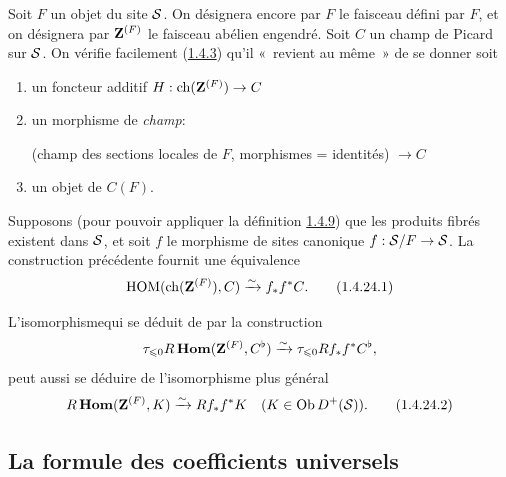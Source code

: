 \documentclass[10pt]{../fichiers-configuration-latex/smfart}
\begin{document}
\subsubsection{}
Soit $F$ un objet du site ${\mathcal S}$. On désignera encore par $F$
le faisceau défini par $F$, et on désignera par $\mathbf{Z}^{(F)}$ le
faisceau abélien engendré. Soit $C$ un champ de Picard sur
${\mathcal S}$. On vérifie facilement (\cf \hyperref[XVIII.lem1.4.3]{1.4.3}) qu'il « revient au même »  de se donner soit
\begin{enumerate}
\renewcommand{\theenumi}{\alph{enumi}}
\renewcommand{\labelenumi}{\theenumi)}
\item un foncteur additif $H:\operatorname{ch}(\mathbf{Z}^{(F)})\rightarrow C$

\item un morphisme de \emph{champ}:

(champ des sections locales de $F$, morphismes = identités)
$\rightarrow C$

\item un objet de $C(F)$.
\end{enumerate}

Supposons (pour pouvoir appliquer la définition
\hyperref[XVIII.subsubsec1.4.9]{1.4.9}) que les
produits fibrés existent dans ${\mathcal S}$, et soit $f$ le morphisme
de sites canonique $f:{\mathcal S}/F\rightarrow {\mathcal S}$. La
construction précédente fournit une équivalence
\begin{equation*}
\operatorname{HOM}(\operatorname{ch}(\mathbf{Z}^{(F)}),C)\xrightarrow{\sim}
f_{\ast}f^{\ast}C{}.\tag{1.4.24.1}
\end{equation*}

L'isomorphisme\pageoriginale qui se déduit de  par la construction
$$
\tau_{\leqslant 0} R\operatorname{\mathbf{Hom}}(\mathbf{Z}^{(F)},C^{\flat})\xrightarrow{\sim}
\tau_{\leqslant 0} Rf_{\ast} f^{\ast}C^{\flat}{},
$$
peut aussi se déduire de l'isomorphisme plus général
\begin{equation*}
R\operatorname{\mathbf{Hom}}(\mathbf{Z}^{(F)},K)\xrightarrow{\sim}
Rf_{\ast}f^{\ast}K\quad (K\in \operatorname{Ob} D^{+}({\mathcal S})){}.\tag{1.4.24.2}
\end{equation*}

\subsection{La formule des coefficients universels}
\end{document}
